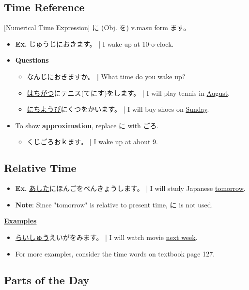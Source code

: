 \documentclass{article}
\begin{document}
\begin{CJK}{UTF8}{min}
\subsection{Time Reference}

[Numerical Time Expression] に (Obj. を) v.masu form ます。

\begin{itemize}
\item {\bf Ex.} じゅうじにおきます。 | I wake up at 10-o-clock.
\item {\bf Questions}
\begin{itemize}
\item なんじにおきますか。 | What time do you wake up?
\item \underline{はちがつ}にテニス(てにす)をします。 | I will play tennis in \underline{August}.
\item \underline{にちようび}にくつをかいます。 | I will buy shoes on \underline{Sunday}.
\end{itemize}
\item To show {\bf approximation}, replace に with ごろ.
\begin{itemize}
\item くじごろおｋます。 | I wake up at about 9.
\end{itemize}
\end{itemize}

\clearpage

\subsection{Relative Time}

\begin{itemize}
\item {\bf Ex.} \underline{あした}にほんごをべんきょうします。 | I will study Japanese \underline{tomorrow}.
\item {\bf Note}: Since "tomorrow" is relative to present time, に is not used.
\end{itemize}

\underline{\bf Examples}

\begin{itemize}
\item \underline{らいしゅう}えいがをみます。 | I will watch movie \underline{next week}.
\item For more examples, consider the time words on textbook page 127.
\end{itemize}

\subsection{Parts of the Day}


\end{CJK}
\end{document}
